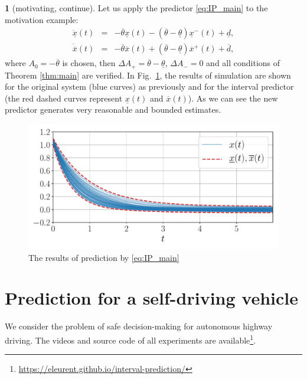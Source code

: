 \documentclass[twocolumn,english]{IEEEtran}
\theoremstyle{plain}
\theoremstyle{definition}
\newtheorem*{example*}{\protect\examplename}
\theoremstyle{plain}
\theoremstyle{plain}
\theoremstyle{remark}
\providecommand{\examplename}{Example}
\begin{document}
\begin{example*}
[motivating, continue] Let us apply the predictor \eqref{eq:IP_main}
to the motivation example:
\begin{eqnarray*}
\dot{\underline{x}}(t) & = & -\overline{\theta}\underline{x}(t)-(\overline{\theta}-\underline{\theta})\underline{x}^{-}(t)+\underline{d},\\
\dot{\overline{x}}(t) & = & -\overline{\theta}\overline{x}(t)+(\overline{\theta}-\underline{\theta})\overline{x}^{+}(t)+\overline{d},
\end{eqnarray*}
where $A_{0}=-\overline{\theta}$ is chosen, then $\Delta A_{+}=\overline{\theta}-\underline{\theta}$, $\Delta A_{-}=0$ and all conditions of Theorem \ref{thm:main} are verified. In Fig.~\ref{fig:IP_New}, the results of simulation are shown for the original system (blue curves) as previously and for the interval predictor (the red dashed curves represent $\underline{x}(t)$ and $\overline{x}(t)$). As we can see the new predictor generates very reasonable and bounded estimates. 
\begin{figure}
\begin{centering}
\includegraphics[width=\linewidth]{predictor}
\par\end{centering}
\caption{\label{fig:IP_New} The results of prediction by \eqref{eq:IP_main}}
\end{figure}
\end{example*}

\section{\label{sec:Examples} Prediction for a self-driving vehicle}

We consider the problem of safe decision-making for autonomous highway driving. The videos and source code of all experiments are available\footnote{\href{https://eleurent.github.io/interval-prediction/}{https://eleurent.github.io/interval-prediction/}}.
\end{document}
